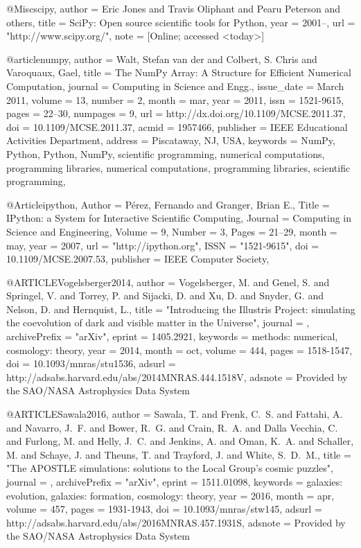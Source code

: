 \documentclass[useAMS,usenatbib]{mnras}
\begin{document}
{{{{{{{{{{{{{{{@Misc{scipy,
  author =    {Eric Jones and Travis Oliphant and Pearu Peterson and others},
  title =     {{SciPy}: Open source scientific tools for {Python}},
  year =      {2001--},
  url = "http://www.scipy.org/",
  note = {[Online; accessed <today>]}
}

@article{numpy,
 author = {Walt, Stefan van der and Colbert, S. Chris and Varoquaux, Gael},
 title = {The NumPy Array: A Structure for Efficient Numerical Computation},
 journal = {Computing in Science and Engg.},
 issue_date = {March 2011},
 volume = {13},
 number = {2},
 month = mar,
 year = {2011},
 issn = {1521-9615},
 pages = {22--30},
 numpages = {9},
 url = {http://dx.doi.org/10.1109/MCSE.2011.37},
 doi = {10.1109/MCSE.2011.37},
 acmid = {1957466},
 publisher = {IEEE Educational Activities Department},
 address = {Piscataway, NJ, USA},
 keywords = {NumPy, Python, Python, NumPy, scientific programming, numerical computations, programming libraries, numerical computations, programming libraries, scientific programming},
} 

@Article{ipython,
  Author    = {P\'erez, Fernando and Granger, Brian E.},
  Title     = {{IP}ython: a System for Interactive Scientific Computing},
  Journal   = {Computing in Science and Engineering},
  Volume    = {9},
  Number    = {3},
  Pages     = {21--29},
  month     = may,
  year      = 2007,
  url       = "http://ipython.org",
  ISSN      = "1521-9615",
  doi       = {10.1109/MCSE.2007.53},
  publisher = {IEEE Computer Society},
}

@ARTICLE{Vogelsberger2014,
   author = {{Vogelsberger}, M. and {Genel}, S. and {Springel}, V. and {Torrey}, P. and 
	{Sijacki}, D. and {Xu}, D. and {Snyder}, G. and {Nelson}, D. and 
	{Hernquist}, L.},
    title = "{Introducing the Illustris Project: simulating the coevolution of dark and visible matter in the Universe}",
  journal = {\mnras},
archivePrefix = "arXiv",
   eprint = {1405.2921},
 keywords = {methods: numerical, cosmology: theory},
     year = 2014,
    month = oct,
   volume = 444,
    pages = {1518-1547},
      doi = {10.1093/mnras/stu1536},
   adsurl = {http://adsabs.harvard.edu/abs/2014MNRAS.444.1518V},
  adsnote = {Provided by the SAO/NASA Astrophysics Data System}
}

@ARTICLE{Sawala2016,
   author = {{Sawala}, T. and {Frenk}, C.~S. and {Fattahi}, A. and {Navarro}, J.~F. and 
	{Bower}, R.~G. and {Crain}, R.~A. and {Dalla Vecchia}, C. and 
	{Furlong}, M. and {Helly}, J.~C. and {Jenkins}, A. and {Oman}, K.~A. and 
	{Schaller}, M. and {Schaye}, J. and {Theuns}, T. and {Trayford}, J. and 
	{White}, S.~D.~M.},
    title = "{The APOSTLE simulations: solutions to the Local Group's cosmic puzzles}",
  journal = {\mnras},
archivePrefix = "arXiv",
   eprint = {1511.01098},
 keywords = {galaxies: evolution, galaxies: formation, cosmology: theory},
     year = 2016,
    month = apr,
   volume = 457,
    pages = {1931-1943},
      doi = {10.1093/mnras/stw145},
   adsurl = {http://adsabs.harvard.edu/abs/2016MNRAS.457.1931S},
  adsnote = {Provided by the SAO/NASA Astrophysics Data System}
}

}}}}}}}}}}}}}}}
\end{document}

